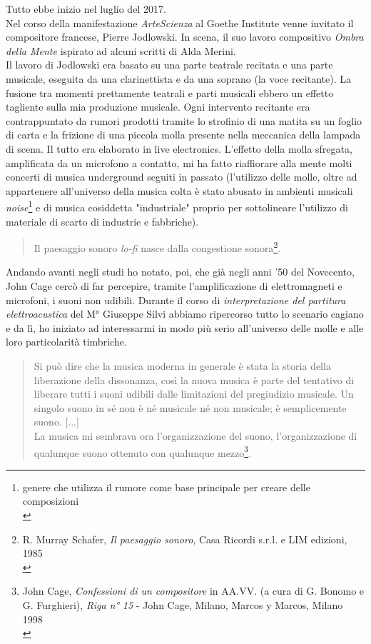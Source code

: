 Tutto ebbe inizio nel luglio del 2017. \\
Nel corso della manifestazione \textit{ArteScienza} al Goethe Institute venne invitato il compositore francese, Pierre Jodlowski. In scena, il suo lavoro compositivo \textit{Ombra della Mente} ispirato ad alcuni scritti di Alda Merini. \\
Il lavoro di Jodlowski era basato su una parte teatrale recitata e una parte musicale, eseguita da una clarinettista e da una soprano (la voce recitante). La fusione tra momenti prettamente teatrali e parti musicali ebbero un effetto tagliente sulla mia produzione musicale. Ogni intervento recitante era contrappuntato da rumori prodotti tramite lo strofinio di una matita su un foglio di carta e la frizione di una piccola molla presente nella meccanica della lampada di scena. Il tutto era elaborato in live electronics. L'effetto della molla sfregata, amplificata da un microfono a contatto, mi ha fatto riaffiorare alla mente molti concerti di musica underground seguiti in passato (l'utilizzo delle molle, oltre ad appartenere all'universo della musica colta è stato abusato in ambienti musicali \textit{noise}\footnote{genere che utilizza il rumore come base principale per creare delle composizioni \\} e di musica cosiddetta "industriale" proprio per sottolineare l'utilizzo di materiale di scarto di industrie e fabbriche).
\begin{quotation}
Il paesaggio sonoro \textit{lo-fi} nasce dalla congestione sonora\footnote{R. Murray Schafer, \textit{Il paesaggio sonoro}, Casa Ricordi s.r.l. e LIM edizioni, 1985 \\}.
\end{quotation}
Andando avanti negli studi ho notato, poi, che già negli anni '50 del Novecento, John Cage cercò di far percepire, tramite l'amplificazione di elettromagneti e microfoni, i suoni non udibili. Durante il corso di \textit{interpretazione del partitura elettroacustica} del M° Giuseppe Silvi abbiamo ripercorso tutto lo scenario cagiano e da lì, ho iniziato ad interessarmi in modo più serio all'universo delle molle e alle loro particolarità timbriche. 
\begin{small}
\begin{quotation}
Si può dire che la musica moderna in generale è stata la storia della liberazione della dissonanza, così la nuova musica è parte del tentativo di liberare tutti i suoni udibili dalle limitazioni del pregiudizio musicale.
Un singolo suono in sé non è né musicale né non musicale; è semplicemente suono. [...] \\
La musica mi sembrava ora l'organizzazione del suono, l'organizzazione di qualunque suono ottenuto con qualunque mezzo\footnote{John Cage, \textit{Confessioni di un compositore} in AA.VV. (a cura di G. Bonomo e G. Furghieri), \textit{Riga n° 15} - John Cage, Milano, Marcos y Marcos, Milano 1998 \\}.
\end{quotation}
\end{small}
